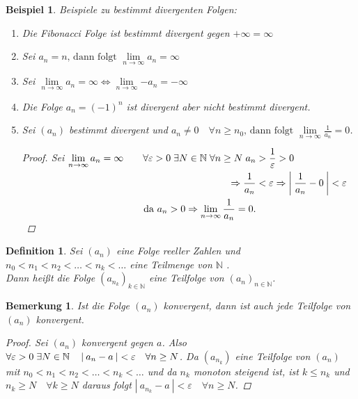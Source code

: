 \documentclass[a4paper,titlepage,oneside]{article}
\def\N{\ensuremath{\mathbb{N}} }
\renewcommand{\epsilon}{\ensuremath{\varepsilon} }
\def\sp{\hspace{0,1cm}}
\renewcommand{\liminf}[2][n]{\ensuremath{\lim\limits_{#1 \rightarrow \infty}{#2}}}
\newcommand{\abs}[1]{\ensuremath{\left|\:#1\:\right|}}
\theoremstyle{thmstyle}
\newtheorem{defi}[satz]{Definition}
\newtheorem{bsp}[satz]{Beispiel}
\newtheorem{bem}[satz]{Bemerkung}
\begin{document}
\begin{bsp}
Beispiele zu bestimmt divergenten Folgen:
\begin{enumerate}
\item Die Fibonacci Folge ist bestimmt divergent gegen \(+ \infty = \infty \)
\item Sei \(a_n = n\text{, dann folgt }\liminf{a_n} = \infty\)
\item Sei \(\liminf{a_n} = \infty \Leftrightarrow \liminf{-a_n} = - \infty\)
\item Die Folge \(a_n = (-1)^n\) ist divergent aber nicht bestimmt divergent.
\item Sei \((a_n)\) bestimmt divergent und $ \displaystyle a_n \ne 0 \quad \forall n \ge n_0\text{, dann folgt }\liminf{\frac{1}{a_n}} = 0$.
\begin{proof}Sei $ \displaystyle \liminf{a_n} = \infty \quad
\begin{aligned}[t] &&\forall \epsilon > 0 \sp \exists N \in \N \sp \forall n \ge N \sp a_n &> \frac{1}{\epsilon} > 0 \\
&&\Rightarrow \frac{1}{a_n} &< \epsilon \Rightarrow \abs{\frac{1}{a_n} - 0} < \epsilon  \\
&&\text{da } a_n > 0 \Rightarrow \liminf{\frac{1}{a_n}} = 0.
\end{aligned}$\\
\end{proof}
\end{enumerate}
\end{bsp}

\begin{defi}
Sei \((a_n)\) eine Folge reeller Zahlen und \(n_0 < n_1 < n_2 < \dots < n_k < \dots \) eine Teilmenge von \N.\\
Dann heißt die Folge \((a_{n_k})_{k \in \N }\) eine Teilfolge von \((a_n)_{n \in \N}\).
\end{defi}

\begin{bem}
Ist die Folge \((a_n)\) konvergent, dann ist auch jede Teilfolge von \((a_n)\) konvergent.
\begin{proof} Sei $(a_n)$ konvergent gegen $a$. Also $ \forall \epsilon > 0  \sp \exists N \in \N \quad \abs{a_n - a} < \epsilon \quad \forall n \ge N$. Da $(a_{n_k})$ eine Teilfolge von $(a_n)$ mit $n_0 < n_1 < n_2 < \dots < n_k < \dots$ und da $n_k$ monoton steigend ist, ist $k \le n_k$ und $n_k \ge N \quad \forall k \ge N $ daraus folgt $\abs{a_{n_k} - a} < \epsilon \quad \forall n \ge N$.
\end{proof}
\end{bem}
\end{document}
